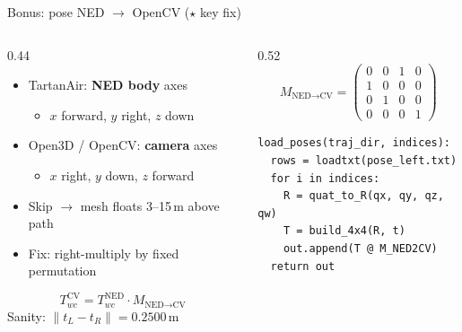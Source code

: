 \documentclass[aspectratio=169,11pt]{beamer}
\newcommand{\orange}[1]{\textcolor{warnOrange}{#1}}
\begin{document}
\begin{frame}[fragile]{Bonus: pose NED $\rightarrow$ OpenCV ($\star$ key fix)}
\begin{columns}[T,totalwidth=\textwidth]
\begin{column}{0.44\textwidth}
\begin{itemize}
    \item TartanAir: \textbf{NED body} axes
    \begin{itemize}
        \item $x$ forward, $y$ right, $z$ down
    \end{itemize}
    \item Open3D / OpenCV: \textbf{camera} axes
    \begin{itemize}
        \item $x$ right, $y$ down, $z$ forward
    \end{itemize}
    \item \orange{Skip $\rightarrow$ mesh floats 3--15\,m above path}
    \item Fix: right-multiply by fixed permutation
\end{itemize}
\[
T^{\text{CV}}_{wc} = T^{\text{NED}}_{wc} \cdot M_{\text{NED}\to\text{CV}}
\]
Sanity: $\|t_L - t_R\| = 0.2500$\,m
\end{column}
\begin{column}{0.52\textwidth}
\scriptsize
\[
M_{\text{NED}\to\text{CV}} =
\begin{pmatrix}
0 & 0 & 1 & 0 \\
1 & 0 & 0 & 0 \\
0 & 1 & 0 & 0 \\
0 & 0 & 0 & 1
\end{pmatrix}
\]
\begin{verbatim}
load_poses(traj_dir, indices):
  rows = loadtxt(pose_left.txt)
  for i in indices:
    R = quat_to_R(qx, qy, qz, qw)
    T = build_4x4(R, t)
    out.append(T @ M_NED2CV)
  return out
\end{verbatim}
\end{column}
\end{columns}
\end{frame}
\end{document}
